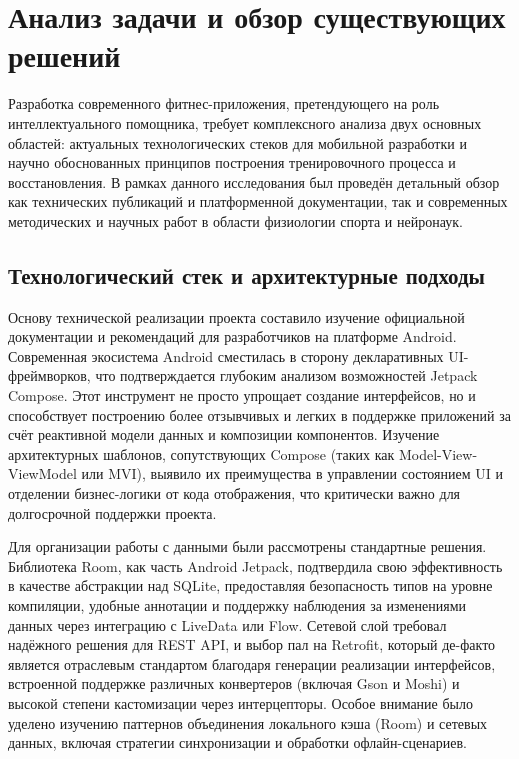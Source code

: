 \section{Анализ задачи и обзор существующих решений}

Разработка современного фитнес-приложения, претендующего на роль интеллектуального помощника, требует комплексного анализа двух основных областей: актуальных технологических стеков для мобильной разработки и научно обоснованных принципов построения тренировочного процесса и восстановления. В рамках данного исследования был проведён детальный обзор как технических публикаций и платформенной документации, так и современных методических и научных работ в области физиологии спорта и нейронаук. \cite{refa,refb}

\subsection{Технологический стек и архитектурные подходы}

Основу технической реализации проекта составило изучение официальной документации и рекомендаций для разработчиков на платформе Android. \cite{refc} Современная экосистема Android сместилась в сторону декларативных UI-фреймворков, что подтверждается глубоким анализом возможностей Jetpack Compose. \cite{refd} Этот инструмент не просто упрощает создание интерфейсов, но и способствует построению более отзывчивых и легких в поддержке приложений за счёт реактивной модели данных и композиции компонентов. Изучение архитектурных шаблонов, сопутствующих Compose (таких как Model-View-ViewModel или MVI), выявило их преимущества в управлении состоянием UI и отделении бизнес-логики от кода отображения, что критически важно для долгосрочной поддержки проекта. \cite{refe}

Для организации работы с данными были рассмотрены стандартные решения. Библиотека Room, как часть Android Jetpack, подтвердила свою эффективность в качестве абстракции над SQLite, предоставляя безопасность типов на уровне компиляции, удобные аннотации и поддержку наблюдения за изменениями данных через интеграцию с LiveData или Flow. \cite{reff} Сетевой слой требовал надёжного решения для REST API, и выбор пал на Retrofit, который де-факто является отраслевым стандартом благодаря генерации реализации интерфейсов, встроенной поддержке различных конвертеров (включая Gson и Moshi) и высокой степени кастомизации через интерцепторы. \cite{refg} Особое внимание было уделено изучению паттернов объединения локального кэша (Room) и сетевых данных, включая стратегии синхронизации и обработки офлайн-сценариев. \cite{refh}

